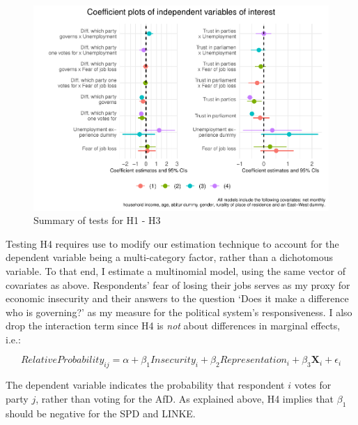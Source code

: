 \documentclass[
]{article}
\begin{document}
\begin{figure}
\centering
\includegraphics{AVCD_Draft_Assignment_Pruned_files/figure-latex/regression-results1-plot-1.pdf}
\caption{Summary of tests for H1 - H3}
\end{figure}

Testing H4 requires use to modify our estimation technique to account
for the dependent variable being a multi-category factor, rather than a
dichotomous variable. To that end, I estimate a multinomial model, using
the same vector of covariates as above. Respondents' fear of losing
their jobs serves as my proxy for economic insecurity and their answers
to the question `Does it make a difference who is governing?' as my
measure for the political system's responsiveness. I also drop the
interaction term since H4 is \emph{not} about differences in marginal
effects, i.e.:

\[
RelativeProbability_{ij} = \alpha + \beta_{1}Insecurity_{i} +  \beta_{2}Representation_{i} + \beta_{3}\textbf{X}_{i} + \epsilon_{i}
\]

The dependent variable indicates the probability that respondent \(i\)
votes for party \(j\), rather than voting for the AfD. As explained
above, H4 implies that \(\beta_{1}\) should be negative for the SPD and
LINKE.
\end{document}
